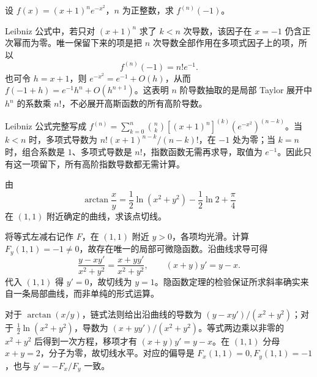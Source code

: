 \documentclass[12pt,fontset=fandol]{ctexart}
\begin{document}
\begin{example}\label{nm-2020-1b}
设 $f(x)=(x+1)^ne^{-x^2}$，$n$ 为正整数，求 $f^{(n)}(-1)$。
\end{example}
\begin{solve}
Leibniz 公式中，若只对 $(x+1)^n$ 求了 $k<n$ 次导数，该因子在 $x=-1$ 仍含正次幂而为零。唯一保留下来的项是把 $n$ 次导数全部作用在多项式因子上的项，所以
\[
 f^{(n)}(-1)=n!e^{-1}.
\]
也可令 $h=x+1$，则 $e^{-x^2}=e^{-1}+O(h)$，从而 $f(-1+h)=e^{-1}h^n+O(h^{n+1})$。这表明 $n$ 阶导数抽取的是局部 Taylor 展开中 $h^n$ 的系数乘 $n!$，不必展开高斯函数的所有高阶导数。

Leibniz 公式完整写成 $f^{(n)}=\sum_{k=0}^n\binom nk[(x+1)^n]^{(k)}(e^{-x^2})^{(n-k)}$。当 $k<n$ 时，多项式导数为 $n!(x+1)^{n-k}/(n-k)!$，在 $-1$ 处为零；当 $k=n$ 时，组合系数是 $1$、多项式导数是 $n!$，指数函数无需再求导，取值为 $e^{-1}$。因此只有这一项留下，所有高阶指数导数都无需计算。

\end{solve}

\begin{example}\label{nm-2020-1c}
由
\[
 \arctan\frac xy=\frac12\ln(x^2+y^2)-\frac12\ln2+\frac\pi4
\]
在 $(1,1)$ 附近确定的曲线，求该点切线。
\end{example}
\begin{solve}
将等式左减右记作 $F$，在 $(1,1)$ 附近 $y>0$，各项均光滑。计算 $F_y(1,1)=-1\ne0$，故存在唯一的局部可微隐函数。沿曲线求导可得
\[
 \frac{y-xy'}{x^2+y^2}=\frac{x+yy'}{x^2+y^2},
 \qquad (x+y)y'=y-x.
\]
代入 $(1,1)$ 得 $y'=0$，故切线为 $y=1$。隐函数定理的检验保证所求斜率确实来自一条局部曲线，而非单纯的形式运算。

对于 $\arctan(x/y)$，链式法则给出沿曲线的导数为 $(y-xy')/(x^2+y^2)$；对于 $\tfrac12\ln(x^2+y^2)$，导数为 $(x+yy')/(x^2+y^2)$。等式两边乘以非零的 $x^2+y^2$ 后得到一次方程，移项才有 $(x+y)y'=y-x$。在 $(1,1)$ 分母 $x+y=2$，分子为零，故切线水平。对应的偏导是 $F_x(1,1)=0,F_y(1,1)=-1$，也与 $y'=-F_x/F_y$ 一致。

\end{solve}
\end{document}
